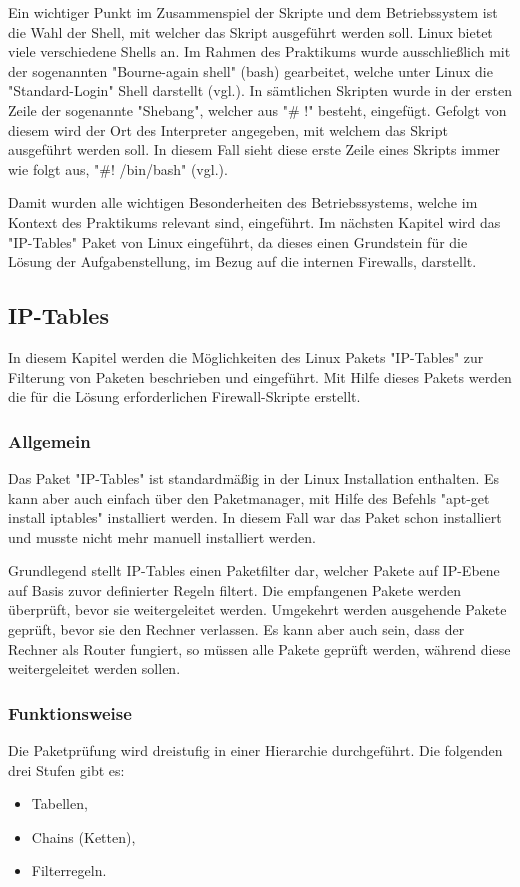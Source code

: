 \documentclass[
a4paper,     %
 headsepline, %
footsepline, %
titlepage,   %
 halfparskip,     %
 fleqn,       %
12pt         %
]{scrartcl}  %
\begin{document}
Ein wichtiger Punkt im Zusammenspiel der Skripte und dem Betriebssystem ist die Wahl der Shell, mit welcher das Skript ausgeführt werden soll. Linux bietet viele verschiedene Shells an. Im Rahmen des Praktikums wurde ausschließlich mit der sogenannten "Bourne-again shell" (bash) gearbeitet, welche unter Linux die "Standard-Login" Shell darstellt (vgl.\cite{bash-2}). In sämtlichen Skripten wurde in der ersten Zeile der sogenannte "Shebang", welcher aus "\# !" besteht, eingefügt. Gefolgt von diesem wird der Ort des Interpreter angegeben, mit welchem das Skript ausgeführt werden soll. In diesem Fall sieht diese erste Zeile eines Skripts immer wie folgt aus, "\#! /bin/bash" (vgl.\cite{shebang-1}). 

Damit wurden alle wichtigen Besonderheiten des Betriebssystems, welche im Kontext des Praktikums relevant sind, eingeführt. Im nächsten Kapitel wird das "IP-Tables" Paket von Linux eingeführt, da dieses einen Grundstein für die Lösung der Aufgabenstellung, im Bezug auf die internen Firewalls, darstellt. 
\subsection{IP-Tables}\label{iptables}
In diesem Kapitel werden die Möglichkeiten des Linux Pakets "IP-Tables" zur Filterung von Paketen beschrieben und eingeführt. Mit Hilfe dieses Pakets werden die für die Lösung erforderlichen Firewall-Skripte erstellt.  

\subsubsection{Allgemein}
Das Paket "IP-Tables" ist standardmäßig in der Linux Installation enthalten. Es kann aber auch einfach über den Paketmanager, mit Hilfe des Befehls "apt-get install iptables" installiert werden. In diesem Fall war das Paket schon installiert und musste nicht mehr manuell installiert werden. 

Grundlegend stellt IP-Tables einen Paketfilter dar, welcher Pakete auf IP-Ebene auf Basis zuvor definierter Regeln filtert. Die empfangenen Pakete werden überprüft, bevor sie weitergeleitet werden. Umgekehrt werden ausgehende Pakete geprüft, bevor sie den Rechner verlassen. Es kann aber auch sein, dass der Rechner als Router fungiert, so müssen alle Pakete geprüft werden, während diese weitergeleitet werden sollen. 
\subsubsection{Funktionsweise}
Die Paketprüfung wird dreistufig in einer Hierarchie durchgeführt. Die folgenden drei Stufen gibt es:
\begin{itemize}
\item Tabellen,
\item Chains (Ketten),
\item Filterregeln.
\end{itemize}
\end{document}
